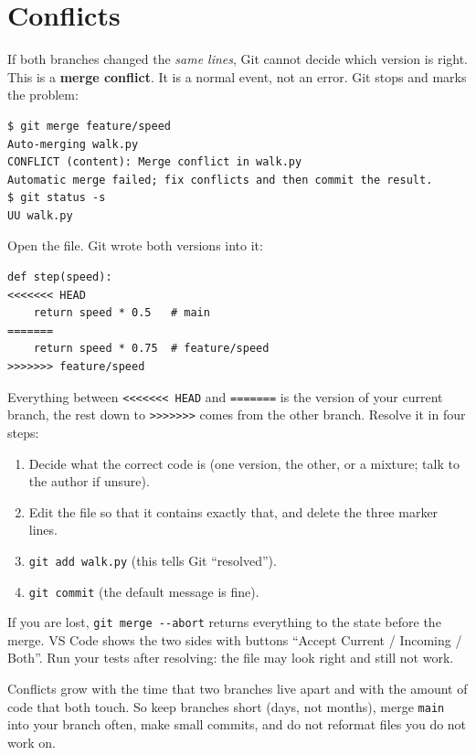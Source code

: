 \section*{Conflicts}
If both branches changed the \emph{same lines}, Git cannot decide which version is right. This is a \textbf{merge conflict}. It is a normal event, not an error. Git stops and marks the problem:
\begin{verbatim}
$ git merge feature/speed
Auto-merging walk.py
CONFLICT (content): Merge conflict in walk.py
Automatic merge failed; fix conflicts and then commit the result.
$ git status -s
UU walk.py
\end{verbatim}
Open the file. Git wrote both versions into it:
\begin{verbatim}
def step(speed):
<<<<<<< HEAD
    return speed * 0.5   # main
=======
    return speed * 0.75  # feature/speed
>>>>>>> feature/speed
\end{verbatim}
Everything between \verb!<<<<<<< HEAD! and \verb!=======! is the version of your current branch, the rest down to \verb!>>>>>>>! comes from the other branch. Resolve it in four steps:
\begin{enumerate}[nosep]
  \item Decide what the correct code is (one version, the other, or a mixture; talk to the author if unsure).
  \item Edit the file so that it contains exactly that, and delete the three marker lines.
  \item \verb!git add walk.py! (this tells Git ``resolved'').
  \item \verb!git commit! (the default message is fine).
\end{enumerate}
If you are lost, \verb!git merge --abort! returns everything to the state before the merge. VS Code shows the two sides with buttons ``Accept Current / Incoming / Both''. Run your tests after resolving: the file may look right and still not work.

\begin{keyidea}
Conflicts grow with the time that two branches live apart and with the amount of code that both touch. So keep branches short (days, not months), merge \texttt{main} into your branch often, make small commits, and do not reformat files you do not work on.
\end{keyidea}

